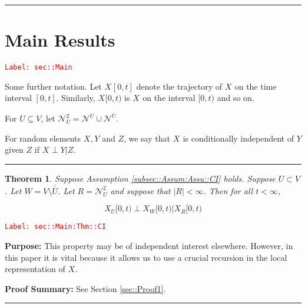 \documentclass[12pt]{article}
\newcommand{\mc}{\mathcal}
\newcommand{\ov}{\overline}
\newcommand{\tr}{\textcolor{red}}
\newcommand{\labe}[1]{\tr{\texttt{Label: #1}}}
\newcommand{\purpose}{\textbf{Purpose: }}
\newcommand{\pfsum}{\textbf{Proof Summary: }}
\newcommand{\ind}{\hspace{24pt}}
\newcommand{\lin}{\rule{\linewidth}{0.4 pt}}
\renewcommand{\U}{U}							%
\newcommand{\UU}{W}								%
\newcommand{\UUU}{R}							%
\renewcommand{\t}{t}							%
\newcommand{\X}{X}								%
\newcommand{\neigh}{\mc{N}}						%
\newcommand{\dneigh}{\mc{N}^2}					%
\newcommand{\vind}[1]{^{#1}}					%
\newcommand{\cind}[1]{_{#1}}					%
\newcommand{\tip}[1]{#1}						%
\newcommand{\dnvind}[1]{_{#1}}				%
\newcommand{\XX}{Y}								%
\newcommand{\XXX}{Z}							%
\newtheorem{thms}{Theorem}[section]
\begin{document}
\lin
\section{Main Results}
\label{sec::Main}\labe{sec::Main}

Some further notation. Let \(\X\cind{}\tip{[0,\t]}\) denote the trajectory of \(\X\cind{}\tip{}\) on the time interval \([0,\t]\). Similarly, \(\X\cind{}\tip{[0,\t)}\) is \(\X\cind{}\tip{}\) on the interval \([0,\t)\) and so on.

\ind For \(\U \subseteq V\), let \(\dneigh\dnvind{\U} = \neigh\vind{\U} \cup \neigh\vind{\ov{\U}}\). 

\ind For random elements \(\X\cind{}\tip{},\XX{}{}\) and \(\XXX{}{}\), we say that \(\X\cind{}\tip{}\) is conditionally independent of \(\XX{}{}\) given \(\XXX{}{}\) if \(\X\cind{}\tip{}\perp\XX{}{}|\XXX{}{}\).

\lin

\begin{thms}
Suppose Assumption \ref{subsec::Assum:Assu::CI} holds. Suppose \(\U \subset V\). Let \(\UU =V\setminus \ov{\ov{\U}}\). Let \(\UUU= \dneigh\dnvind{U}\) and suppose that \(|\UUU| < \infty\). Then for all \(\t < \infty\),

\[\X\cind{\U}\tip{[0,\t)}\perp \X\cind{\UU}\tip{[0,\t)}|\X\cind{\UUU}\tip{[0,\t)}\]
\label{sec::Main:Thm::CI}
\end{thms}
\labe{sec::Main:Thm::CI}

\purpose This property may be of independent interest elsewhere. However, in this paper it is vital because it allows us to use a crucial recursion in the local representation of \(\X\cind{}\tip{}\).

\pfsum See Section \ref{sec::Proof1}.

\lin
\end{document}
